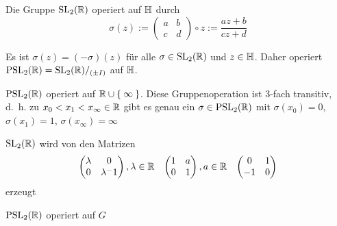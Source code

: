 \begin{proposition}%
    \begin{propenum}
        \item Die Gruppe $\mathrm{SL}_2(\mathbb{R})$ operiert auf $\mathbb{H}$ durch
              \[\sigma(z):= \begin{pmatrix}a & b\\c & d\end{pmatrix} \circ z := \frac{az + b}{cz + d}\]
        \item Es ist $\sigma(z) = (-\sigma)(z)$ für alle $\sigma \in \mathrm{SL}_2(\mathbb{R})$
              und $z \in \mathbb{H}$. Daher operiert $\mathrm{PSL}_2(\mathbb{R}) = \mathrm{SL}_2(\mathbb{R}) /_{(\pm I)}$
              auf $\mathbb{H}$.
        \item \label{prop:15.2c} $\mathrm{PSL}_2(\mathbb{R})$ operiert auf $\mathbb{R} \cup \Set{\infty}$.
              Diese Gruppenoperation ist 3-fach transitiv, d.~h. zu
              $x_0 < x_1 < x_\infty \in \mathbb{R}$ gibt es genau ein
              $\sigma \in \mathrm{PSL}_2(\mathbb{R})$ mit $\sigma(x_0) = 0$,
              $\sigma(x_1) = 1$, $\sigma(x_\infty) = \infty$
        \item \label{prop:15.2d} $\mathrm{SL}_2(\mathbb{R})$ wird von den Matrizen
              \[\begin{pmatrix}\lambda & 0\\ 0 & \lambda^-1\end{pmatrix}, \lambda \in \mathbb{R} \;\;\; 
                \begin{pmatrix}1 & a\\ 0 & 1\end{pmatrix}, a \in \mathbb{R}\;\;\; 
                \begin{pmatrix}0 & 1\\-1 & 0\end{pmatrix}\]
              erzeugt
        \item \label{prop:15.2e} $\mathrm{PSL}_2(\mathbb{R})$ operiert auf $G$
    \end{propenum}
\end{proposition}

